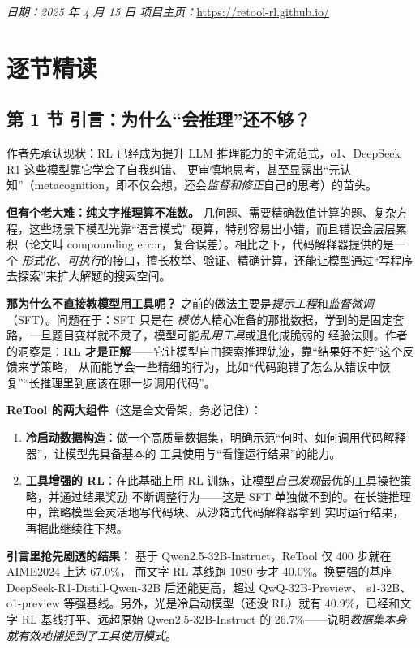 \documentclass[11pt,UTF8,fontset=fandol]{ctexart}
\begin{document}
\smallskip
\noindent\textit{日期：2025 年 4 月 15 日 \quad 项目主页：}\url{https://retool-rl.github.io/}

\section{逐节精读}

\subsection{第 1 节 引言：为什么“会推理”还不够？}

作者先承认现状：RL 已经成为提升 LLM 推理能力的主流范式，o1、DeepSeek R1 这些模型靠它学会了自我纠错、
更审慎地思考，甚至显露出“元认知”（metacognition，即不仅会想，还会\emph{监督和修正}自己的思考）的苗头。

\textbf{但有个老大难：纯文字推理算不准数。} 几何题、需要精确数值计算的题、复杂方程，这些场景下模型光靠“语言模式”
硬算，特别容易出小错，而且错误会层层累积（论文叫 compounding error，复合误差）。相比之下，代码解释器提供的是一个
\emph{形式化、可执行}的接口，擅长枚举、验证、精确计算，还能让模型通过“写程序去探索”来扩大解题的搜索空间。

\textbf{那为什么不直接教模型用工具呢？} 之前的做法主要是\emph{提示工程}和\emph{监督微调}（SFT）。问题在于：SFT 只是在
\emph{模仿}人精心准备的那批数据，学到的是固定套路，一旦题目变样就不灵了，模型可能\emph{乱用工具}或退化成脆弱的
经验法则。作者的洞察是：\textbf{RL 才是正解}——它让模型自由探索推理轨迹，靠“结果好不好”这个反馈来学策略，
从而能学会一些精细的行为，比如“代码跑错了怎么从错误中恢复”“长推理里到底该在哪一步调用代码”。

\textbf{ReTool 的两大组件}（这是全文骨架，务必记住）：
\begin{enumerate}[leftmargin=2em,itemsep=2pt]
  \item \textbf{冷启动数据构造}：做一个高质量数据集，明确示范“何时、如何调用代码解释器”，让模型先具备基本的
  工具使用与“看懂运行结果”的能力。
  \item \textbf{工具增强的 RL}：在此基础上用 RL 训练，让模型\emph{自己发现}最优的工具操控策略，并通过结果奖励
  不断调整行为——这是 SFT 单独做不到的。在长链推理中，策略模型会灵活地写代码块、从沙箱式代码解释器拿到
  实时运行结果，再据此继续往下想。
\end{enumerate}

\textbf{引言里抢先剧透的结果：} 基于 Qwen2.5-32B-Instruct，ReTool 仅 400 步就在 AIME2024 上达 67.0\%，
而文字 RL 基线跑 1080 步才 40.0\%。换更强的基座 DeepSeek-R1-Distill-Qwen-32B 后还能更高，超过 QwQ-32B-Preview、
s1-32B、o1-preview 等强基线。另外，光是冷启动模型（还没 RL）就有 40.9\%，已经和文字 RL 基线打平、远超原始
Qwen2.5-32B-Instruct 的 26.7\%——说明\emph{数据集本身就有效地捕捉到了工具使用模式}。
\end{document}
